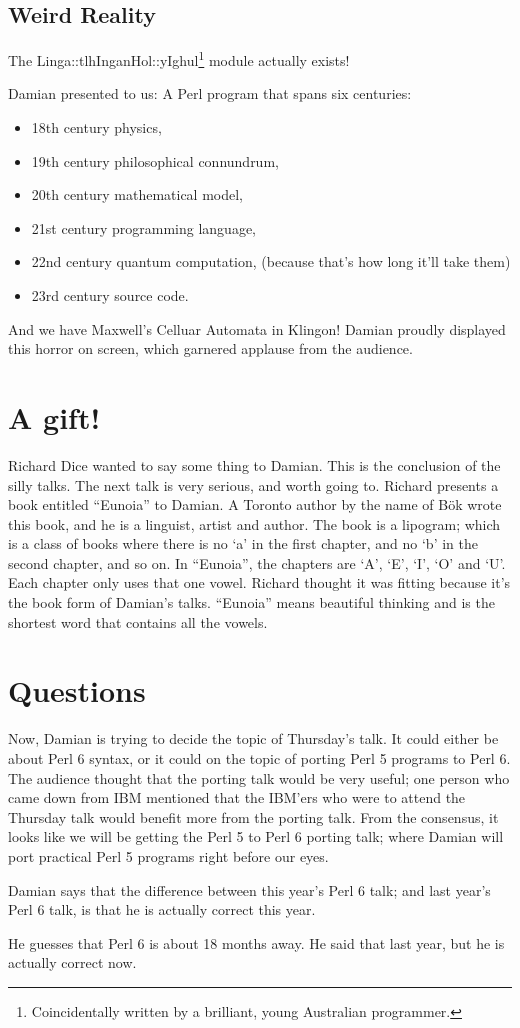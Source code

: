 \documentclass{article}
\begin{document}
\subsection{Weird Reality}
The Linga::tlhInganHol::yIghul\footnote{Coincidentally written by a
brilliant, young Australian programmer.} module actually exists!

Damian presented to us:
A Perl program that spans six centuries:
\begin{itemize}
\item 18th century physics, 
\item 19th century philosophical connundrum, 
\item 20th century mathematical model, 
\item 21st century programming language, 
\item 22nd century quantum computation, (because that's how long it'll
take them)
\item 23rd century source code.
\end{itemize}

And we have Maxwell's Celluar Automata in Klingon!  Damian proudly
displayed this horror on screen, which garnered applause from the
audience.

\section{A gift!}
Richard Dice wanted to say some thing to Damian.  
This is the conclusion of the
silly talks.  The next talk is very serious, and worth going to.
Richard presents a book entitled ``Eunoia'' to Damian.  A Toronto author
by the name of B\"ok wrote this book, and he is
a linguist, artist and author.  The book is a lipogram;
which is a class of books where there is no `a' in the first chapter, 
and no `b' in the second chapter, and so on.  In ``Eunoia'', the chapters 
are `A', `E', `I', `O' and `U'.  Each chapter only uses that one vowel.
Richard thought it was fitting because it's the book form of Damian's 
talks.  ``Eunoia'' means beautiful thinking and is the shortest word 
that contains all the vowels.

\section{Questions}
Now, Damian is trying to decide the topic of Thursday's talk.  It could
either be about Perl 6 syntax, or it could on the topic of porting Perl
5 programs to Perl 6.  The audience thought that the porting talk would
be very useful; one person who came down from IBM mentioned that the
IBM'ers who were to attend the Thursday talk would benefit more from the
porting talk.  From the consensus, it looks like we will be getting the
Perl 5 to Perl 6 porting talk; where Damian will port practical Perl 5
programs right before our eyes.

Damian says that the difference between this year's Perl 6 talk; and
last year's Perl 6 talk, is that he is actually correct this year.

He guesses that Perl 6 is about 18 months away.  
He said that last year, but he is actually correct now.
\end{document}
